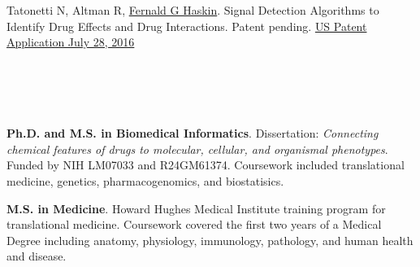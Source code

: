 \begin{resume}
Tatonetti N, Altman R,  \underline{Fernald G Haskin}. Signal Detection Algorithms to Identify Drug Effects and Drug Interactions.  Patent pending. \href{http://appft1.uspto.gov/netacgi/nph-Parser?Sect1=PTO1&Sect2=HITOFF&d=PG01&p=1&u=/netahtml/PTO/srchnum.html&r=1&f=G&l=50&s1=20160217395.PGNR.&OS=DN/20160217395&RS=DN/20160217395}{US Patent Application July 28, 2016}

\section{}
\begin{format}
  \\
  \body\\
\end{format}

\title{}
\dates{}
\begin{position}
\vspace{1.5em}
\begin{listitems}

\item \textbf{Ph.D. and M.S. in Biomedical Informatics}.  Dissertation:
    \textit{Connecting chemical features of drugs to molecular, cellular, and
    organismal phenotypes}.  Funded by NIH LM07033 and R24GM61374. Coursework included
    translational medicine, genetics, pharmacogenomics, and biostatisics.

\item \textbf{M.S. in Medicine}.  Howard
    Hughes Medical Institute training program for translational medicine.  Coursework covered
    the first two years of a Medical Degree including anatomy, physiology,
    immunology, pathology, and human health and disease.

\end{listitems}
\end{position}

%
%


\end{resume}

